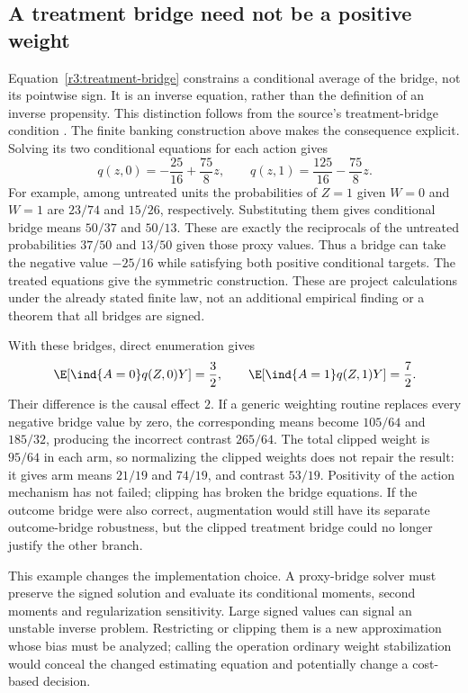 \subsection{A treatment bridge need not be a positive weight}
\label{rel29:signed-proxy-bridge}
Equation~\eqref{r3:treatment-bridge} constrains a conditional average of
the bridge, not its pointwise sign. It is an inverse equation, rather
than the definition of an inverse propensity. This distinction follows
from the source's treatment-bridge condition
\citep[Section 4, Assumption 7 and equation (9)]{ghassami2022}.
The finite banking construction above makes the consequence explicit.
Solving its two conditional equations for each action gives
\[
 q(z,0)=-\frac{25}{16}+\frac{75}{8}z,\qquad
 q(z,1)=\frac{125}{16}-\frac{75}{8}z.
\]
For example, among untreated units the probabilities of $Z=1$ given
$W=0$ and $W=1$ are $23/74$ and $15/26$, respectively. Substituting
them gives conditional bridge means $50/37$ and $50/13$. These are
exactly the reciprocals of the untreated probabilities $37/50$ and
$13/50$ given those proxy values. Thus a bridge can take the negative
value $-25/16$ while satisfying both positive conditional targets.
The treated equations give the symmetric construction. These are
project calculations under the already stated finite law, not an
additional empirical finding or a theorem that all bridges are signed.

With these bridges, direct enumeration gives
\[
 \E[\ind\{A=0\}q(Z,0)Y]=\frac32,\qquad
 \E[\ind\{A=1\}q(Z,1)Y]=\frac72.
\]
Their difference is the causal effect $2$. If a generic weighting
routine replaces every negative bridge value by zero, the corresponding
means become $105/64$ and $185/32$, producing the incorrect contrast
$265/64$. The total clipped weight is $95/64$ in each arm, so
normalizing the clipped weights does not repair the result: it gives
arm means $21/19$ and $74/19$, and contrast $53/19$. Positivity of the
action mechanism has not failed; clipping has broken the bridge
equations. If the outcome bridge were also correct, augmentation
would still have its separate outcome-bridge robustness, but the
clipped treatment bridge could no longer justify the other branch.

This example changes the implementation choice. A proxy-bridge solver
must preserve the signed solution and evaluate its conditional moments,
second moments and regularization sensitivity. Large signed values can
signal an unstable inverse problem. Restricting or clipping them is a
new approximation whose bias must be analyzed; calling the operation
ordinary weight stabilization would conceal the changed estimating
equation and potentially change a cost-based decision.

